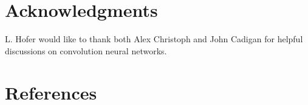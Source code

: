 \documentclass[10pt,journal,compsoc]{IEEEtran}
\begin{document}
\section*{Acknowledgments}
L. Hofer would like to thank both Alex Christoph and John Cadigan for helpful discussions on convolution neural networks.

\section*{References}

{}





\end{document}
